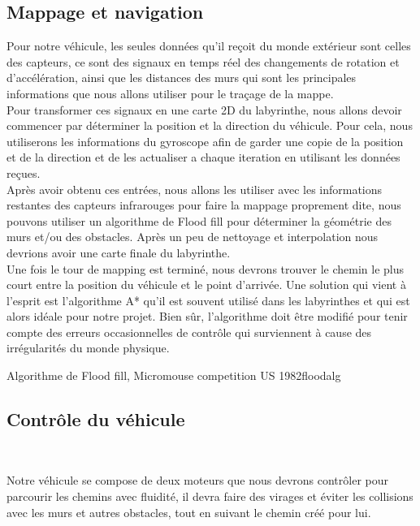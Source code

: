 \subsection{Mappage et navigation} \label{sec:rechChem} 

   Pour notre véhicule, les seules données qu'il reçoit du monde extérieur sont
celles des capteurs, ce sont des signaux en temps réel des changements de
rotation et d'accélération, ainsi que les distances des murs qui sont les
principales informations que nous allons utiliser pour le traçage de la mappe. \\

   Pour transformer ces signaux en une carte 2D du labyrinthe, nous allons devoir
commencer par déterminer la position et la direction du véhicule. Pour cela,
nous utiliserons les informations du gyroscope afin de garder une copie de la
position et de la direction et de les actualiser a chaque iteration en
utilisant les données reçues. \\

   Après avoir obtenu ces entrées, nous allons les utiliser avec les informations
restantes des capteurs infrarouges pour faire la mappage proprement dite, nous
pouvons utiliser un algorithme de Flood fill pour déterminer la géométrie des
murs et/ou des obstacles. Après un peu de nettoyage et interpolation nous
devrions avoir une carte finale du labyrinthe. \\

   Une fois le tour de mapping est terminé, nous devrons trouver le chemin le plus
court entre la position du véhicule et le point d'arrivée. Une solution qui
vient à l'esprit est l'algorithme A* qu'il est souvent utilisé dans les
labyrinthes et qui est alors idéale pour notre projet. Bien sûr, l'algorithme
doit être modifié pour tenir compte des erreurs occasionnelles de contrôle qui
surviennent à cause des irrégularités du monde physique.

{Algorithme de Flood fill, Micromouse competition US 1982}{floodalg}

\subsection{Contrôle du véhicule} \label{sec:ctrlComm}

Notre véhicule se compose de deux moteurs que nous devrons contrôler pour
parcourir les chemins avec fluidité, il devra faire des virages et éviter les
collisions avec les murs et autres obstacles, tout en suivant le chemin créé
pour lui. \\

